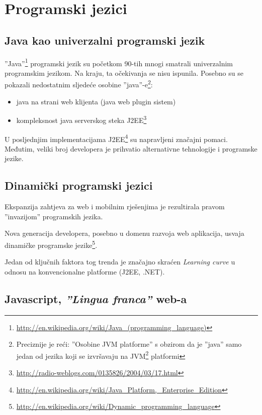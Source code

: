 \documentclass[times, utf8, seminar]{fit}
\begin{document}
\section{Programski jezici}

\subsection{Java kao univerzalni programski jezik}

''Java''\footnote{\url{http://en.wikipedia.org/wiki/Java_(programming_language)}} programski jezik su početkom 90-tih mnogi smatrali univerzalnim programskim jezikom. Na kraju, ta očekivanja se nisu ispunila. Posebno su se pokazali nedostatnim sljedeće osobine ''java''-e\footnote{Preciznije je reći: ''Osobine JVM platforme'' s obzirom da je ''java'' samo jedan od jezika koji se izvršavaju na JVM\footnote{\url{http://en.wikipedia.org/wiki/Java_virtual_machine}} platformi}: 
\begin{itemize}
  \item java na strani web klijenta (java web plugin sistem)
  \item kompleksnost java serverskog steka J2EE\footnote{\url{http://radio-weblogs.com/0135826/2004/03/17.html}} 
\end{itemize}

U posljednjim implementacijama J2EE\footnote{\url{http://en.wikipedia.org/wiki/Java_Platform,_Enterprise_Edition}} su napravljeni značajni pomaci. Međutim, veliki broj developera je prihvatio alternativne tehnologije i programske jezike.

\subsection{Dinamički programski jezici}

Ekspanzija zahtjeva za web i mobilnim rješenjima je rezultirala pravom ''invazijom'' programskih jezika. 

Nova generacija developera, posebno u domenu razvoja web aplikacija, usvaja dinamičke programske jezike\footnote{\url{http://en.wikipedia.org/wiki/Dynamic_programming_language}}. 
 
Jedan od ključnih faktora tog trenda je značajno skraćen \emph{Learning curve} u odnosu na konvencionalne platforme (J2EE, .NET).

\subsection{Javascript, \emph{''Lingua franca''} web-a}
\end{document}
